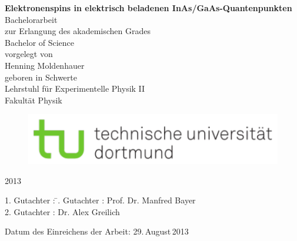 
\newcommand{\thetitle}{Elektronenspins in elektrisch beladenen InAs/GaAs-Quantenpunkten}

\thispagestyle{empty}
\begin{center}
\Huge\textbf{\thetitle}
\vfill
\Large
\vspace{20pt}
Bachelorarbeit \\ zur Erlangung des akademischen Grades \\ Bachelor of Science \\
\vspace{20pt}
\normalsize
vorgelegt von \\[5pt]
{\Large Henning Moldenhauer} \\[5pt]
geboren in Schwerte \\
\vspace{20pt}
Lehrstuhl f\"ur Experimentelle Physik II \\
Fakult\"at Physik \\
\begin{figure}[h]
	\centering
	\includegraphics[width=.6\textwidth]{images/title/TU_Logo.pdf}
\end{figure}
2013
\end{center}
\newpage


\thispagestyle{empty}
\vspace*{\fill}
\begin{tabbing}
1. Gutachter : \=. Gutachter : \>Prof. Dr. Manfred Bayer \\[11pt]
2. Gutachter : \>Dr. Alex Greilich \\[11pt]
\end{tabbing}
\vspace{11pt}
Datum des Einreichens der Arbeit: 29.\,August\,2013
\newpage

